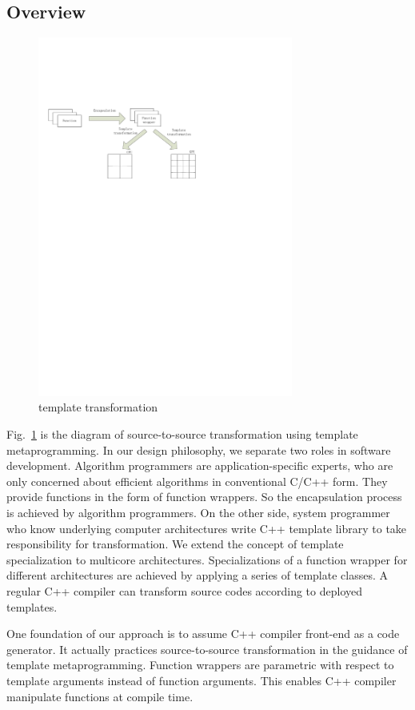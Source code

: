 \documentclass[10pt, conference, compsocconf]{IEEEtran}
\begin{document}
\subsection{Overview}
\begin{figure}[htp]
\includegraphics[width=3.3in]{overview}
\caption{template transformation}\label{fig:overview}
\end{figure}
Fig.~\ref{fig:overview} is the diagram of source-to-source
transformation using template metaprogramming. In our design philosophy, we separate two roles in software
development. Algorithm programmers are application-specific experts,
who are only concerned about efficient algorithms in conventional
C/C++ form. They provide functions in the form of function wrappers. So
the encapsulation process is achieved by algorithm programmers. On the other side, system
programmer who know underlying computer architectures write C++
template library to take responsibility for transformation. We extend
the concept of template specialization to multicore architectures.
Specializations of a function wrapper for different architectures are
achieved by applying a series of template classes. A regular C++ compiler
can transform source codes according to deployed templates.

One foundation of our approach is to assume C++
compiler front-end as a code generator. It actually practices
source-to-source transformation in the guidance of template
metaprogramming. Function wrappers are parametric with respect to
template arguments instead of function arguments. This enables
C++ compiler manipulate  functions at compile time. 
\end{document}
